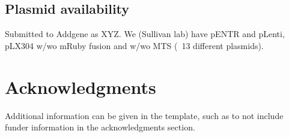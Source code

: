 \documentclass[9pt,lineno]{elife}
\begin{document}
\subsection{Plasmid availability}
Submitted to Addgene as XYZ.
We (Sullivan lab) have pENTR and pLenti, pLX304 w/wo mRuby fusion and w/wo MTS (~13 different plasmids).





























\section{Acknowledgments}

Additional information can be given in the template, such as to not include funder information in the acknowledgments section.

\nocite{*} %

\end{document}
